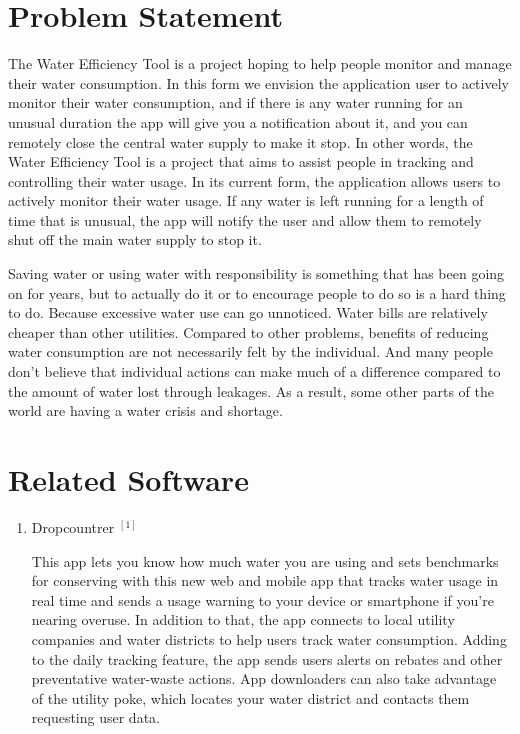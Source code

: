 \documentclass[10pt]{article}
\begin{document}
\begin{multicols}{2}
\section{Problem Statement}
The Water Efficiency Tool is a project hoping to help people monitor and manage their water consumption. In this form we envision the application user to actively monitor their water consumption, and if there is any water running for an unusual duration the app will give you a notification about it, and you can remotely close the central water supply to make it stop. In other words, the Water Efficiency Tool is a project that aims to assist people in tracking and controlling their water usage. In its current form, the application allows users to actively monitor their water usage. If any water is left running for a length of time that is unusual, the app will notify the user and allow them to remotely shut off the main water supply to stop it.

Saving water or using water with responsibility is something that has been going on for years, but to actually do it or to encourage people to do so is a hard thing to do. Because excessive water use can go unnoticed. Water bills are relatively cheaper than other utilities. Compared to other problems, benefits of reducing water consumption are not necessarily felt by the individual. And many people don't believe that individual actions can make much of a difference compared to the amount of water lost through leakages. As a result, some other parts of the world are having a water crisis and shortage.


\section{Related Software}

\begin{enumerate}

  \item {Dropcountrer ${ }^{[1]}$}
  
  This app lets you know how much water you are using and sets benchmarks for conserving with this new web and mobile app that tracks water usage in real time and sends a usage warning to your device or smartphone if you're nearing overuse. In addition to that, the app connects to local utility companies and water districts to help users track water consumption. Adding to the daily tracking feature, the app sends users alerts on rebates and other preventative water-waste actions. App downloaders can also take advantage of the utility poke, which locates your water district and contacts them requesting user data.


\end{enumerate}
\end{multicols}
\end{document}
